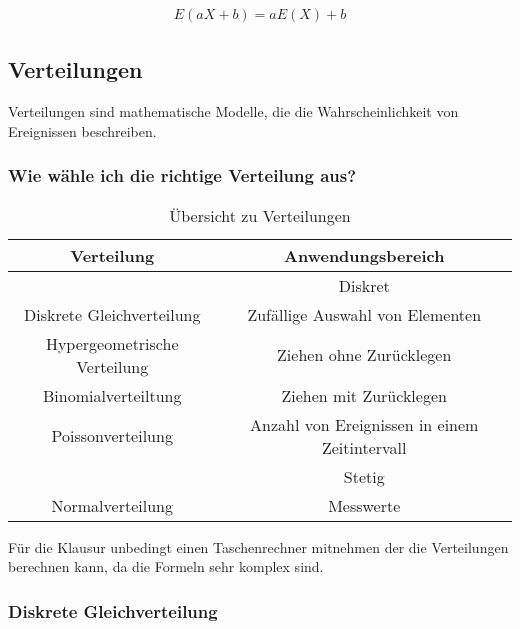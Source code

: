 \documentclass[12pt]{scrartcl}
\begin{document}
\begin{align*}
    E(aX+b) = aE(X) + b
\end{align*}

\subsection{Verteilungen}

Verteilungen sind mathematische Modelle, die die Wahrscheinlichkeit von Ereignissen beschreiben.

\subsubsection{Wie wähle ich die richtige Verteilung aus?}

\begin{table}[h]
    \begin{tabular}{ | c | c | }
        \hline
        Verteilung                   & Anwendungsbereich                             \\
        \hline
        \hline
                                     & Diskret                                       \\
        \hline
        Diskrete Gleichverteilung    & Zufällige Auswahl von Elementen               \\
        \hline
        Hypergeometrische Verteilung & Ziehen ohne Zurücklegen                       \\
        \hline
        Binomialverteiltung          & Ziehen mit Zurücklegen                        \\
        \hline
        Poissonverteilung            & Anzahl von Ereignissen in einem Zeitintervall \\
        \hline
        \hline
                                     & Stetig                                        \\
        \hline
        Normalverteilung             & Messwerte                                     \\
        \hline
    \end{tabular}
    \caption{Übersicht zu Verteilungen}
\end{table}

Für die Klausur unbedingt einen Taschenrechner mitnehmen der die Verteilungen berechnen kann,
da die Formeln sehr komplex sind.

\subsubsection{Diskrete Gleichverteilung}
\end{document}
